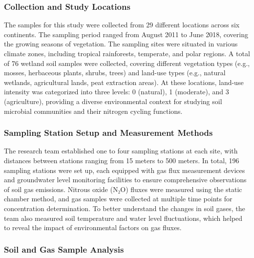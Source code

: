 \documentclass[
]{article}
\begin{document}
\hypertarget{collection-and-study-locations}{%
\subsubsection{\texorpdfstring{\textbf{Collection and Study
Locations}}{Collection and Study Locations}}\label{collection-and-study-locations}}

The samples for this study were collected from 29 different locations
across six continents. The sampling period ranged from August 2011 to
June 2018, covering the growing seasons of vegetation. The sampling
sites were situated in various climate zones, including tropical
rainforests, temperate, and polar regions. A total of 76 wetland soil
samples were collected, covering different vegetation types (e.g.,
mosses, herbaceous plants, shrubs, trees) and land-use types (e.g.,
natural wetlands, agricultural lands, peat extraction areas). At these
locations, land-use intensity was categorized into three levels: 0
(natural), 1 (moderate), and 3 (agriculture), providing a diverse
environmental context for studying soil microbial communities and their
nitrogen cycling functions.

\hypertarget{sampling-station-setup-and-measurement-methods}{%
\subsubsection{\texorpdfstring{\textbf{Sampling Station Setup and
Measurement
Methods}}{Sampling Station Setup and Measurement Methods}}\label{sampling-station-setup-and-measurement-methods}}

The research team established one to four sampling stations at each
site, with distances between stations ranging from 15 meters to 500
meters. In total, 196 sampling stations were set up, each equipped with
gas flux measurement devices and groundwater level monitoring facilities
to ensure comprehensive observations of soil gas emissions. Nitrous
oxide (N₂O) fluxes were measured using the static chamber method, and
gas samples were collected at multiple time points for concentration
determination. To better understand the changes in soil gases, the team
also measured soil temperature and water level fluctuations, which
helped to reveal the impact of environmental factors on gas fluxes.

\hypertarget{soil-and-gas-sample-analysis}{%
\subsubsection{\texorpdfstring{\textbf{Soil and Gas Sample
Analysis}}{Soil and Gas Sample Analysis}}\label{soil-and-gas-sample-analysis}}
\end{document}
